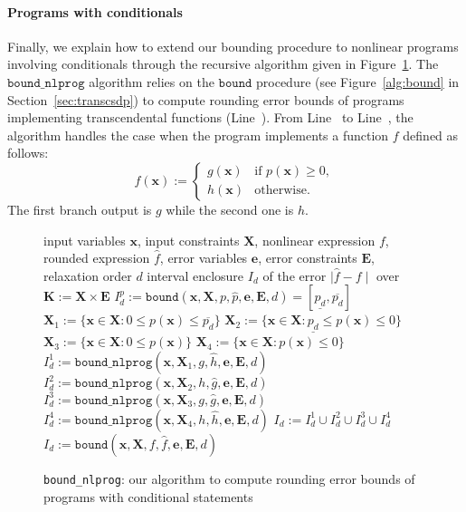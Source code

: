 \documentclass[preprint,fleqn,nocopyrightspace]{sigplanconf}
\newcommand{\code}[1]{\lstinline{#1}}
\newcommand{\x}{\mathbf{x}}
\newcommand{\e}{\mathbf{e}}
\def\E{\mathbf{E}}
\def\K{\mathbf{K}}
\def\X{\mathbf{X}}
\newcommand{\boundfun}[7]{\mathtt{bound}(#1, #2, #3, #4, #5, #6, #7)}
\newcommand{\bound}{\mathtt{bound}}
\newcommand{\boundnlprogfun}[7]{\mathtt{bound\_nlprog}(#1, #2, #3, #4, #5, #6, #7)}
\newcommand{\boundnlprog}{\mathtt{bound\_nlprog}}
\theoremstyle{plain}
\begin{document}
\paragraph{Programs with conditionals}
%
Finally, we explain how to extend our bounding procedure to nonlinear programs involving conditionals through the recursive algorithm given in Figure~\ref{alg:bound_nlprog}.
The $\boundnlprog$ algorithm relies on the $\bound$ procedure (see Figure~\ref{alg:bound} in Section~\ref{sec:transcsdp}) to compute rounding error bounds of programs implementing transcendental functions (Line~).
From Line~ to Line~, the algorithm handles the case when the program implements a function $f$ defined as follows:
\[   
f (\x) := 
     \begin{cases}
       g(\x) &\text{if } p(\x) \geq 0,\\
       h(\x) &\text{otherwise}.
     \end{cases}
\]
The first branch output is $g$ while the second one is $h$.
%
\vspace*{-0.05cm}
\begin{figure}[!ht]
\begin{algorithmic}[1]
\Require input variables $\x$, input constraints $\X$, nonlinear expression $f$, rounded expression $\hat{f}$, error variables $\e$, error constraints $\E$, relaxation order $d$
\Ensure interval enclosure $I_d$ of the error $\mid \hat{f} - f  \mid$ over $\K := \X \times \E$
%
 \label{line:cnd}
\State $I_d^p := \boundfun{\x}{\X}{p}{\hat{p}}{\e}{\E}{d} = [\underline{p_d}, \overline{p_d}]$ \label{line:polcnd}
\State $\X_1 := \{ \x \in \X : 0 \leq p(\x) \leq \overline{p_d} \}$ \label{line:X1}
\State $\X_2 := \{ \x \in \X : \underline{p_d} \leq p(\x) \leq 0 \}$\label{line:X2}
\State $\X_3 := \{ \x \in \X : 0 \leq p(\x) \}$\label{line:X3}
\State $\X_4 := \{ \x \in \X : p(\x) \leq 0 \}$\label{line:X4}
\State $I_d^1 := \boundnlprogfun{\x}{\X_1}{g}{\hat{h}}{\e}{\E}{d}$\label{line:I1}
\State $I_d^2 := \boundnlprogfun{\x}{\X_2}{h}{\hat{g}}{\e}{\E}{d}$\label{line:I2}
\State $I_d^3 := \boundnlprogfun{\x}{\X_3}{g}{\hat{g}}{\e}{\E}{d}$\label{line:I3}
\State $I_d^4 := \boundnlprogfun{\x}{\X_4}{h}{\hat{h}}{\e}{\E}{d}$\label{line:I4}
\State \Return $I_d := I_d^1 \cup I_d^2 \cup I_d^3 \cup I_d^4$ \label{line:endcnd}
\Else ~ \Return $I_d := \boundfun{\x}{\X}{f}{\hat{f}}{\e}{\E}{d}$ \label{line:noncnd}
\EndIf
%
\end{algorithmic}
\caption{\code{bound_nlprog}: our algorithm to compute rounding error bounds of  programs with conditional statements}
\label{alg:bound_nlprog}
\end{figure}
%
\end{document}
